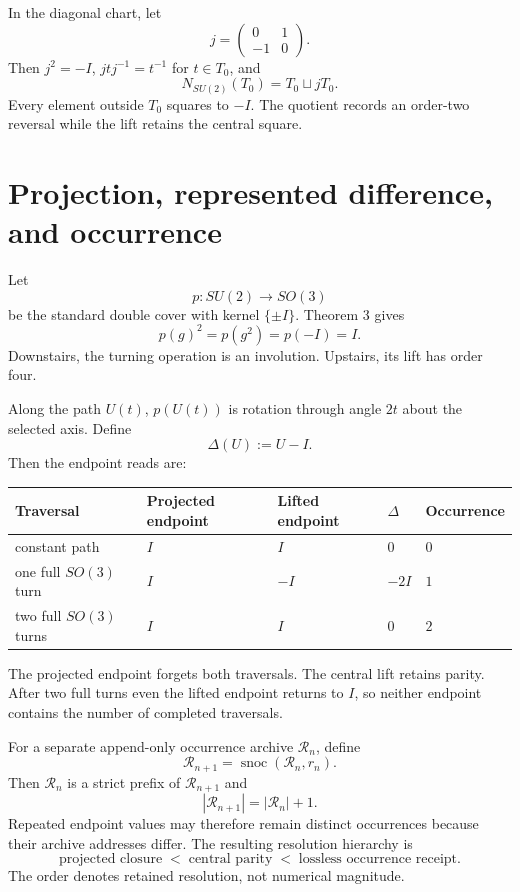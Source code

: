 \documentclass[11pt]{article}
\newcommand{\snoc}{\operatorname{snoc}}
\begin{document}
In the diagonal chart, let
\[
j=\begin{pmatrix}0&1\\-1&0\end{pmatrix}.
\]
Then $j^2=-I$, $jtj^{-1}=t^{-1}$ for $t\in T_0$, and
\[
N_{SU(2)}(T_0)=T_0\sqcup jT_0.
\]
Every element outside $T_0$ squares to $-I$. The quotient records an order-two reversal while the lift retains the central square.

\section{Projection, represented difference, and occurrence}
Let
\[
p:SU(2)\to SO(3)
\]
be the standard double cover with kernel $\{\pm I\}$. Theorem 3 gives
\[
p(g)^2=p(g^2)=p(-I)=I.
\]
Downstairs, the turning operation is an involution. Upstairs, its lift has order four.

Along the path $U(t)$, $p(U(t))$ is rotation through angle $2t$ about the selected axis. Define
\[
\Delta(U):=U-I.
\]
Then the endpoint reads are:

\begin{center}
\begin{tabular}{@{}lllll@{}}
\toprule
Traversal & Projected endpoint & Lifted endpoint & $\Delta$ & Occurrence \\
\midrule
constant path & $I$ & $I$ & $0$ & $0$ \\
one full $SO(3)$ turn & $I$ & $-I$ & $-2I$ & $1$ \\
two full $SO(3)$ turns & $I$ & $I$ & $0$ & $2$ \\
\bottomrule
\end{tabular}
\end{center}

The projected endpoint forgets both traversals. The central lift retains parity. After two full turns even the lifted endpoint returns to $I$, so neither endpoint contains the number of completed traversals.

For a separate append-only occurrence archive $\mathcal R_n$, define
\[
\mathcal R_{n+1}=\snoc(\mathcal R_n,r_n).
\]
Then $\mathcal R_n$ is a strict prefix of $\mathcal R_{n+1}$ and
\[
|\mathcal R_{n+1}|=|\mathcal R_n|+1.
\]
Repeated endpoint values may therefore remain distinct occurrences because their archive addresses differ. The resulting resolution hierarchy is
\[
\boxed{\text{projected closure}\;<\;\text{central parity}\;<\;\text{lossless occurrence receipt}.}
\]
The order denotes retained resolution, not numerical magnitude.
\end{document}
